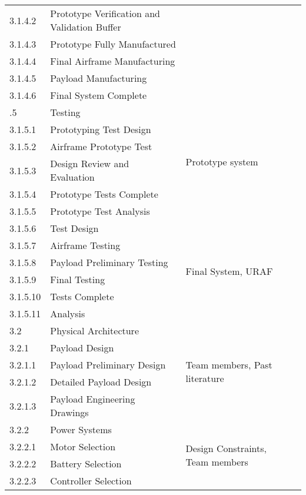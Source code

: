 \begin{longtable}[c]{|l|l|p{4cm}|p{10cm}|}
3.1.4.2 & Prototype Verification and Validation Buffer &  &  \\ \cline{1-2}
3.1.4.3 & Prototype Fully Manufactured &  &  \\ \cline{1-2}
3.1.4.4 & Final Airframe Manufacturing &  &  \\ \cline{1-2}
3.1.4.5 & Payload Manufacturing &  &  \\ \cline{1-2}
3.1.4.6 & Final System Complete &  &  \\ \cline{1-3} \newpage
3.1.5 & Testing & \multirow{6}{*}{\parbox{4cm}{Prototype system}} &  \\ \cline{1-2}
3.1.5.1 & Prototyping Test Design &  &  \\ \cline{1-2}
3.1.5.2 & Airframe Prototype Test &  &  \\ \cline{1-2}
3.1.5.3 & Design Review and Evaluation &  &  \\ \cline{1-2}
3.1.5.4 & Prototype Tests Complete &  &  \\ \cline{1-2}
3.1.5.5 & Prototype Test Analysis &  &  \\ \cline{1-3}
3.1.5.6 & Test Design & \multirow{6}{*}{\parbox{4cm}{Final System, URAF}} &  \\ \cline{1-2}
3.1.5.7 & Airframe Testing &  &  \\ \cline{1-2}
3.1.5.8 & Payload Preliminary Testing &  &  \\ \cline{1-2}
3.1.5.9 & Final Testing &  &  \\ \cline{1-2}
3.1.5.10 & Tests Complete &  &  \\ \cline{1-2}
3.1.5.11 & Analysis &  &  \\ \cline{1-3}
3.2 & Physical Architecture & \multirow{5}{*}{\parbox{4cm}{Team members, Past literature}} &  \\ \cline{1-2}
3.2.1 & Payload Design &  &  \\ \cline{1-2}
3.2.1.1 & Payload Preliminary Design &  &  \\ \cline{1-2}
3.2.1.2 & Detailed Payload Design &  &  \\ \cline{1-2}
3.2.1.3 & Payload Engineering Drawings &  &  \\ \cline{1-3}
3.2.2 & Power Systems & \multirow{4}{*}{\parbox{4cm}{Design Constraints, Team members}} &  \\ \cline{1-2}
3.2.2.1 & Motor Selection &  &  \\ \cline{1-2}
3.2.2.2 & Battery Selection &  &  \\ \cline{1-2}
3.2.2.3 & Controller Selection &  &  \\ \hline 

\end{longtable}
